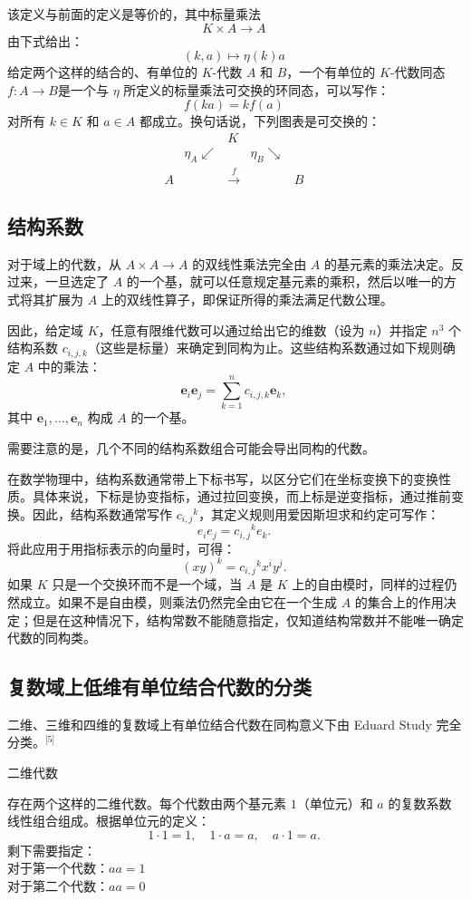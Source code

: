 该定义与前面的定义是等价的，其中标量乘法
$$
K \times A \to A~
$$
由下式给出：
$$
(k, a) \mapsto \eta(k)a~
$$
给定两个这样的结合的、有单位的 $K$-代数 $A$ 和 $B$，一个有单位的 $K$-代数同态$f : A \to B$是一个与 $\eta$ 所定义的标量乘法可交换的环同态，可以写作：
$$
f(ka) = k f(a)~
$$
对所有 $k \in K$ 和 $a \in A$ 都成立。换句话说，下列图表是可交换的：
$$
\begin{matrix}
& & K & & \\
& \eta_A \swarrow & & \eta_B \searrow & \\
A & & \xrightarrow{f} & & B
\end{matrix}~
$$
\subsection{结构系数}
对于域上的代数，从 $A \times A \to A$ 的双线性乘法完全由 $A$ 的基元素的乘法决定。反过来，一旦选定了 $A$ 的一个基，就可以任意规定基元素的乘积，然后以唯一的方式将其扩展为 $A$ 上的双线性算子，即保证所得的乘法满足代数公理。

因此，给定域 $K$，任意有限维代数可以通过给出它的维数（设为 $n$）并指定 $n^3$ 个结构系数 $c_{i,j,k}$（这些是标量）来确定到同构为止。这些结构系数通过如下规则确定 $A$ 中的乘法：
$$
\mathbf{e}_i \mathbf{e}_j = \sum_{k=1}^{n} c_{i,j,k} \mathbf{e}_k,~
$$
其中 $\mathbf{e}_1, \ldots, \mathbf{e}_n$ 构成 $A$ 的一个基。

需要注意的是，几个不同的结构系数组合可能会导出同构的代数。

在数学物理中，结构系数通常带上下标书写，以区分它们在坐标变换下的变换性质。具体来说，下标是协变指标，通过拉回变换，而上标是逆变指标，通过推前变换。因此，结构系数通常写作 $c_{i,j}{}^{k}$，其定义规则用爱因斯坦求和约定可写作：
$$
e_i e_j = c_{i,j}{}^{k} e_k.~
$$
将此应用于用指标表示的向量时，可得：
$$
(xy)^k = c_{i,j}{}^{k} x^i y^j.~
$$
如果 $K$ 只是一个交换环而不是一个域，当 $A$ 是 $K$ 上的自由模时，同样的过程仍然成立。如果不是自由模，则乘法仍然完全由它在一个生成 $A$ 的集合上的作用决定；但是在这种情况下，结构常数不能随意指定，仅知道结构常数并不能唯一确定代数的同构类。
\subsection{复数域上低维有单位结合代数的分类}
二维、三维和四维的复数域上有单位结合代数在同构意义下由 Eduard Study 完全分类。\(^\text{[5]}\)

二维代数

存在两个这样的二维代数。每个代数由两个基元素 $1$（单位元）和 $a$ 的复数系数线性组合组成。根据单位元的定义：
$$
1 \cdot 1 = 1, \quad 1 \cdot a = a, \quad a \cdot 1 = a.~
$$
剩下需要指定：\\
对于第一个代数：$a a = 1$\\
对于第二个代数：$a a = 0$


